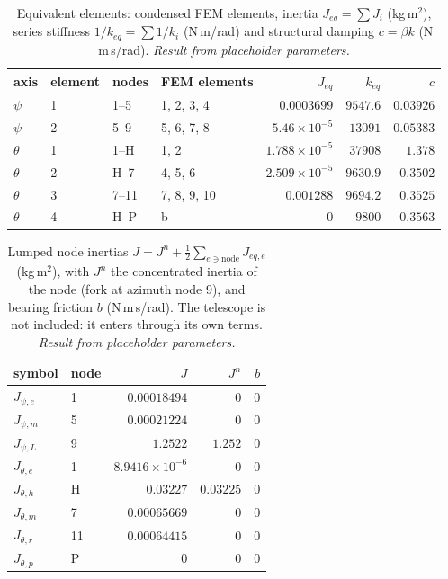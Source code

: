 \documentclass[10pt,a4paper]{article}
\numberwithin{equation}{section}
\begin{document}
\begin{table}[H]\centering\small
\caption{Equivalent elements: condensed FEM elements, inertia $J_{eq} = \sum J_i$ (kg\,m$^2$), series stiffness $1/k_{eq} = \sum 1/k_i$ (N\,m/rad) and structural damping $c = \beta k$ (N\,m\,s/rad). \emph{Result from placeholder parameters.}}\label{tab:lump_elements}
\begin{tabular}{llllrrr}\toprule
axis & element & nodes & FEM elements & $J_{eq}$ & $k_{eq}$ & $c$ \\ \midrule
$\psi$ & 1 & 1--5 & 1, 2, 3, 4 & $0.0003699$ & $9547.6$ & $0.03926$ \\
$\psi$ & 2 & 5--9 & 5, 6, 7, 8 & $5.46\times10^{-5}$ & $13091$ & $0.05383$ \\
$\theta$ & 1 & 1--H & 1, 2 & $1.788\times10^{-5}$ & $37908$ & $1.378$ \\
$\theta$ & 2 & H--7 & 4, 5, 6 & $2.509\times10^{-5}$ & $9630.9$ & $0.3502$ \\
$\theta$ & 3 & 7--11 & 7, 8, 9, 10 & $0.001288$ & $9694.2$ & $0.3525$ \\
$\theta$ & 4 & H--P & b & $0$ & $9800$ & $0.3563$ \\
\bottomrule\end{tabular}\end{table}
\begin{table}[H]\centering\small
\caption{Lumped node inertias $J = J^n + \tfrac12\sum_{e\ni\text{node}}J_{eq,e}$ (kg\,m$^2$), with $J^n$ the concentrated inertia of the node (fork at azimuth node 9), and bearing friction $b$ (N\,m\,s/rad). The telescope is not included: it enters through its own terms. \emph{Result from placeholder parameters.}}\label{tab:lump_nodes}
\begin{tabular}{llrrr}\toprule
symbol & node & $J$ & $J^n$ & $b$ \\ \midrule
$J_{\psi,e}$ & 1 & $0.00018494$ & $0$ & $0$ \\
$J_{\psi,m}$ & 5 & $0.00021224$ & $0$ & $0$ \\
$J_{\psi,L}$ & 9 & $1.2522$ & $1.252$ & $0$ \\
$J_{\theta,e}$ & 1 & $8.9416\times10^{-6}$ & $0$ & $0$ \\
$J_{\theta,h}$ & H & $0.03227$ & $0.03225$ & $0$ \\
$J_{\theta,m}$ & 7 & $0.00065669$ & $0$ & $0$ \\
$J_{\theta,r}$ & 11 & $0.00064415$ & $0$ & $0$ \\
$J_{\theta,p}$ & P & $0$ & $0$ & $0$ \\
\bottomrule\end{tabular}\end{table}
\end{document}
